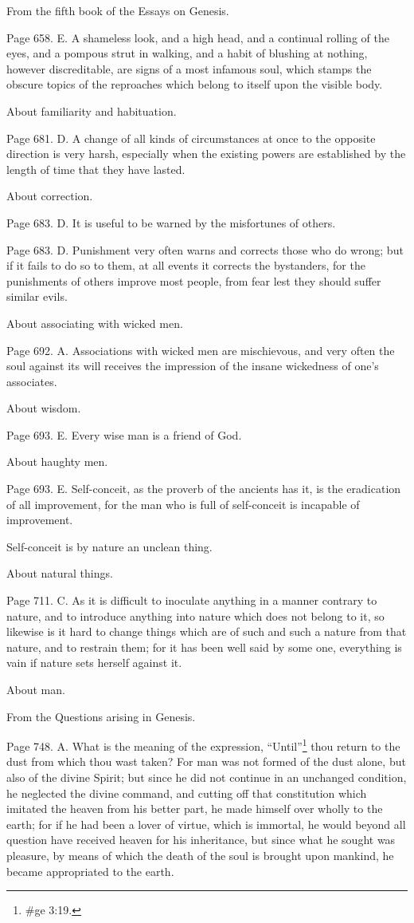 From the fifth book of the Essays on Genesis.

Page 658. E. A shameless look, and a high head, and a continual rolling of the eyes, and a
pompous strut in walking, and a habit of blushing at nothing, however discreditable, are signs of a
most infamous soul, which stamps the obscure topics of the reproaches which belong to itself upon
the visible body.

About familiarity and habituation.

Page 681. D. A change of all kinds of circumstances at once to the opposite direction is very
harsh, especially when the existing powers are established by the length of time that they have
lasted.

About correction.

Page 683. D. It is useful to be warned by the misfortunes of others.

Page 683. D. Punishment very often warns and corrects those who do wrong; but if it fails to do so
to them, at all events it corrects the bystanders, for the punishments of others improve most
people, from fear lest they should suffer similar evils.

About associating with wicked men.

Page 692. A. Associations with wicked men are mischievous, and very often the soul against its
will receives the impression of the insane wickedness of one's associates.

About wisdom.

Page 693. E. Every wise man is a friend of God.

About haughty men.

Page 693. E. Self-conceit, as the proverb of the ancients has it, is the eradication of all
improvement, for the man who is full of self-conceit is incapable of improvement.

Self-conceit is by nature an unclean thing.

About natural things.

Page 711. C. As it is difficult to inoculate anything in a manner contrary to nature, and to introduce
anything into nature which does not belong to it, so likewise is it hard to change things which are of
such and such a nature from that nature, and to restrain them; for it has been well said by some
one, everything is vain if nature sets herself against it.

About man.

From the Questions arising in Genesis.

Page 748. A. What is the meaning of the expression, ``Until''\footnote{\#ge 3:19.} thou return to the dust
from which thou wast taken? For man was not formed of the dust alone, but also of the divine
Spirit; but since he did not continue in an unchanged condition, he neglected the divine command,
and cutting off that constitution which imitated the heaven from his better part, he made himself
over wholly to the earth; for if he had been a lover of virtue, which is immortal, he would beyond all
question have received heaven for his inheritance, but since what he sought was pleasure, by
means of which the death of the soul is brought upon mankind, he became appropriated to the
earth.

